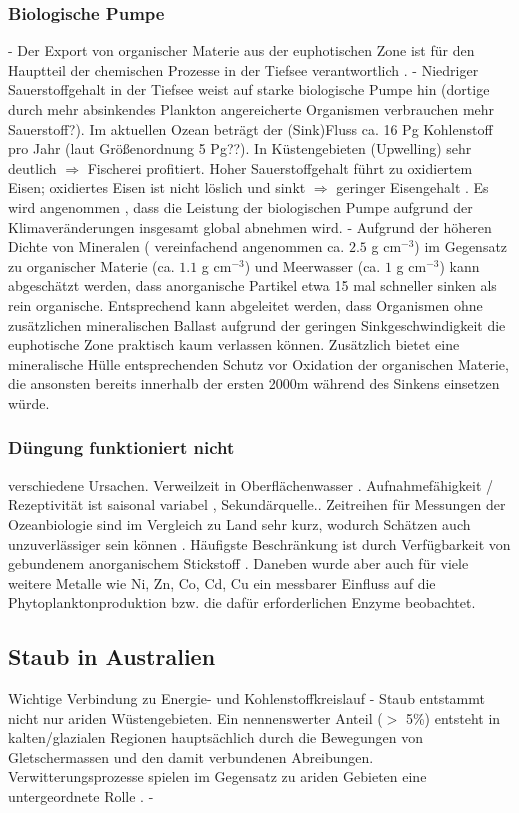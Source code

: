 \documentclass[12pt,a4paper,onecolumn,draft]{scrartcl}
\begin{document}
\subsubsection{Biologische Pumpe} \label{sec:biopump}
- Der Export von organischer Materie aus der euphotischen Zone ist für den Hauptteil der chemischen Prozesse in der Tiefsee verantwortlich \citep{Emerson.2009}. - Niedriger Sauerstoffgehalt in der Tiefsee weist auf starke biologische Pumpe hin (dortige durch mehr absinkendes Plankton angereicherte Organismen verbrauchen mehr Sauerstoff?). Im aktuellen Ozean beträgt der (Sink)Fluss ca. 16 Pg Kohlenstoff pro Jahr \citep{Falkowski.1998} (laut \citet{Emerson.2009} Größenordnung 5  Pg??). In Küstengebieten (Upwelling) sehr deutlich $\Rightarrow$ Fischerei profitiert. Hoher Sauerstoffgehalt führt zu oxidiertem Eisen; oxidiertes Eisen ist nicht löslich und sinkt $\Rightarrow$ geringer Eisengehalt \citep{Falkowski.1998}. Es wird angenommen , dass die Leistung der biologischen Pumpe aufgrund der Klimaveränderungen insgesamt global abnehmen wird. - Aufgrund der höheren Dichte von Mineralen ( vereinfachend angenommen ca. $2.5$ g cm$^{-3}$) im Gegensatz zu organischer Materie (ca. $1.1$ g cm$^{-3}$)  und Meerwasser (ca. $1$ g cm$^{-3}$) kann abgeschätzt werden, dass anorganische Partikel etwa 15 mal schneller sinken als rein organische. Entsprechend kann abgeleitet werden, dass Organismen ohne zusätzlichen mineralischen Ballast aufgrund der geringen Sinkgeschwindigkeit die euphotische Zone praktisch kaum verlassen können. Zusätzlich bietet eine mineralische Hülle entsprechenden Schutz vor Oxidation der organischen Materie, die ansonsten bereits innerhalb der ersten 2000m während des Sinkens einsetzen würde\citep{Emerson.2009}.
\subsubsection{Düngung funktioniert nicht}
verschiedene Ursachen. Verweilzeit in Oberflächenwasser \citep{Hayes.2015}. Aufnahmefähigkeit / Rezeptivität ist saisonal variabel \citep{Gabric.2016}, Sekundärquelle.\citep{Falkowski.1998}. Zeitreihen für Messungen der Ozeanbiologie sind im Vergleich zu Land sehr kurz, wodurch Schätzen auch unzuverlässiger sein können \citep{Falkowski.1998}. Häufigste Beschränkung ist durch Verfügbarkeit von gebundenem anorganischem Stickstoff \citep{Falkowski.1998}. Daneben wurde aber auch für viele weitere Metalle wie Ni, Zn, Co, Cd, Cu ein messbarer Einfluss auf die Phytoplanktonproduktion bzw. die dafür erforderlichen Enzyme beobachtet.
\subsection{Staub in Australien} \label{sec:Staub}
Wichtige Verbindung zu Energie- und Kohlenstoffkreislauf \citep{Shao.2011} - Staub entstammt nicht nur ariden Wüstengebieten. Ein nennenswerter Anteil ($>$ 5\%) entsteht in kalten/glazialen Regionen hauptsächlich durch die Bewegungen von Gletschermassen und den damit verbundenen Abreibungen. Verwitterungsprozesse spielen im Gegensatz zu ariden Gebieten eine untergeordnete Rolle \citep{Marx.2018}. -
\end{document}
